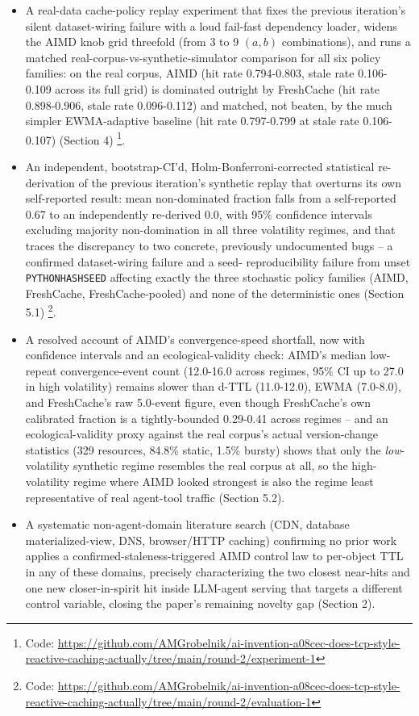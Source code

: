 \documentclass[11pt,letterpaper]{article}
\begin{document}
\begin{itemize}
\item A real-data cache-policy replay experiment that fixes the previous iteration's silent dataset-wiring
  failure with a loud fail-fast dependency loader, widens the AIMD knob grid threefold (from 3 to 9
  $(a, b)$ combinations), and runs a matched real-corpus-vs-synthetic-simulator comparison for all six
  policy families: on the real corpus, AIMD (hit rate 0.794-0.803, stale rate 0.106-0.109 across its full
  grid) is dominated outright by FreshCache (hit rate 0.898-0.906, stale rate 0.096-0.112) and matched, not
  beaten, by the much simpler EWMA-adaptive baseline (hit rate 0.797-0.799 at stale rate 0.106-0.107)
  (Section 4) \footnote{Code: \url{https://github.com/AMGrobelnik/ai-invention-a08cec-does-tcp-style-reactive-caching-actually/tree/main/round-2/experiment-1}}.
\item An independent, bootstrap-CI'd, Holm-Bonferroni-corrected statistical re-derivation of the previous
  iteration's synthetic replay that overturns its own self-reported result: mean non-dominated fraction
  falls from a self-reported 0.67 to an independently re-derived 0.0, with 95\% confidence intervals
  excluding majority non-domination in all three volatility regimes, and that traces the discrepancy to
  two concrete, previously undocumented bugs -- a confirmed dataset-wiring failure and a seed-
  reproducibility failure from unset \texttt{PYTHONHASHSEED} affecting exactly the three stochastic policy
  families (AIMD, FreshCache, FreshCache-pooled) and none of the deterministic ones (Section 5.1)
  \footnote{Code: \url{https://github.com/AMGrobelnik/ai-invention-a08cec-does-tcp-style-reactive-caching-actually/tree/main/round-2/evaluation-1}}.
\item A resolved account of AIMD's convergence-speed shortfall, now with confidence intervals and an
  ecological-validity check: AIMD's median low-repeat convergence-event count (12.0-16.0 across regimes,
  95\% CI up to 27.0 in high volatility) remains slower than d-TTL (11.0-12.0), EWMA (7.0-8.0), and
  FreshCache's raw 5.0-event figure, even though FreshCache's own calibrated fraction is a tightly-bounded
  0.29-0.41 across regimes -- and an ecological-validity proxy against the real corpus's actual
  version-change statistics (329 resources, 84.8\% static, 1.5\% bursty) shows that only the \emph{low}-volatility
  synthetic regime resembles the real corpus at all, so the high-volatility regime where AIMD looked
  strongest is also the regime least representative of real agent-tool traffic (Section 5.2).
\item A systematic non-agent-domain literature search (CDN, database materialized-view, DNS, browser/HTTP
  caching) confirming no prior work applies a confirmed-staleness-triggered AIMD control law to per-object
  TTL in any of these domains, precisely characterizing the two closest near-hits and one new closer-in-spirit
  hit inside LLM-agent serving that targets a different control variable, closing the paper's remaining
  novelty gap (Section 2).
\end{itemize}
\end{document}
